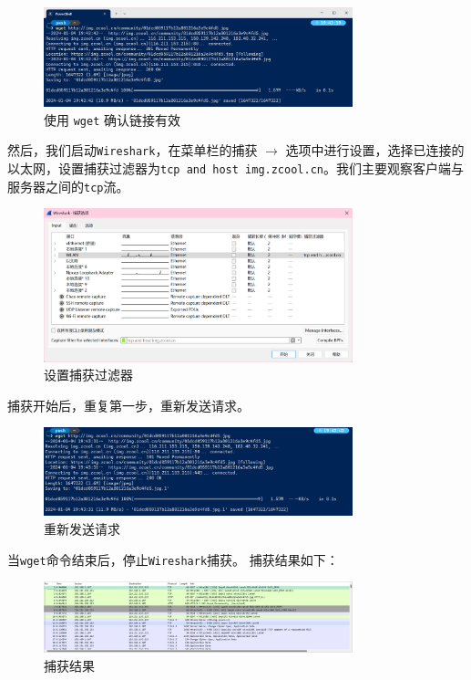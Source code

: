 \documentclass{article}
\begin{document}
\begin{figure}[H]
  \centering
  \includegraphics[width=0.8\textwidth]{img/1.png}
  \caption{使用 \texttt{wget} 确认链接有效}
\end{figure}

然后，我们启动\texttt{Wireshark}，在菜单栏的捕获 \( \to \) 选项中进行设置，选择已连接的以太网，设置捕获过滤器为\texttt{tcp and host img.zcool.cn}。我们主要观察客户端与服务器之间的\texttt{tcp}流。

\begin{figure}[H]
  \centering
  \includegraphics[width=0.8\textwidth]{img/2.png}
  \caption{设置捕获过滤器}
\end{figure}

捕获开始后，重复第一步，重新发送请求。

\begin{figure}[H]
  \centering
  \includegraphics[width=0.8\textwidth]{img/3.png}
  \caption{重新发送请求}
\end{figure}

当\texttt{wget}命令结束后，停止\texttt{Wireshark}捕获。
捕获结果如下：

\begin{figure}[H]
  \centering
  \includegraphics[width=0.8\textwidth]{img/4.png}
  \caption{捕获结果}
\end{figure}
\end{document}

